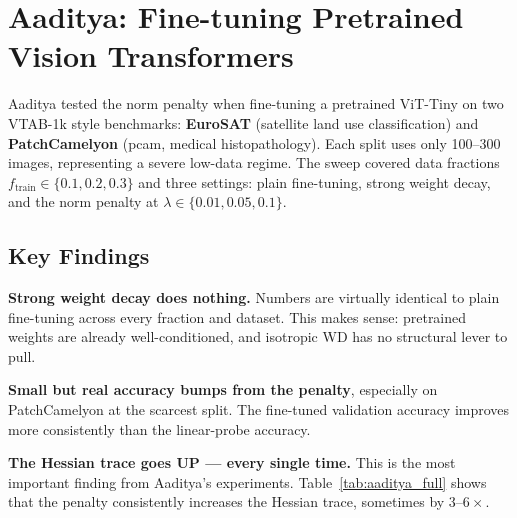 \documentclass[11pt,a4paper]{article}
\begin{document}
\section{Aaditya: Fine-tuning Pretrained Vision Transformers}
\label{sec:aaditya}

Aaditya tested the norm penalty when fine-tuning a pretrained ViT-Tiny on two VTAB-1k style benchmarks: \textbf{EuroSAT} (satellite land use classification) and \textbf{PatchCamelyon} (pcam, medical histopathology). Each split uses only 100--300 images, representing a severe low-data regime. The sweep covered data fractions $f_{\text{train}} \in \{0.1, 0.2, 0.3\}$ and three settings: plain fine-tuning, strong weight decay, and the norm penalty at $\lambda \in \{0.01, 0.05, 0.1\}$.

\subsection{Key Findings}

\textbf{Strong weight decay does nothing.} Numbers are virtually identical to plain fine-tuning across every fraction and dataset. This makes sense: pretrained weights are already well-conditioned, and isotropic WD has no structural lever to pull.

\textbf{Small but real accuracy bumps from the penalty}, especially on PatchCamelyon at the scarcest split. The fine-tuned validation accuracy improves more consistently than the linear-probe accuracy.

\textbf{The Hessian trace goes UP --- every single time.} This is the most important finding from Aaditya's experiments. Table~\ref{tab:aaditya_full} shows that the penalty consistently increases the Hessian trace, sometimes by $3$--$6\times$.
\end{document}
